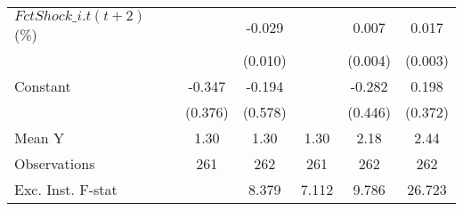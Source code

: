{\begin{tabular}{l*{5}{c}}
\addlinespace
$ FctShock\_{i.t}(t+2)$ (\%)&                     &      -0.029\sym{**} &                     &       0.007         &       0.017\sym{***}\\
                    &                     &     (0.010)         &                     &     (0.004)         &     (0.003)         \\
\addlinespace
Constant            &      -0.347         &      -0.194         &                     &      -0.282         &       0.198         \\
                    &     (0.376)         &     (0.578)         &                     &     (0.446)         &     (0.372)         \\
\midrule
Mean Y              &        1.30         &        1.30         &        1.30         &        2.18         &        2.44         \\
Observations        &         261         &         262         &         261         &         262         &         262         \\
Exc. Inst. F-stat   &                     &       8.379         &       7.112         &       9.786         &      26.723         \\
\bottomrule
\end{tabular}
}
